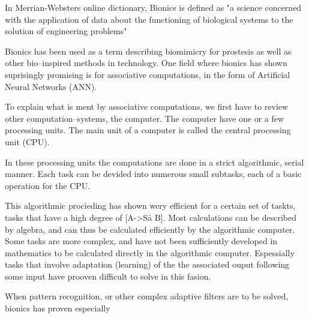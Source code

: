 
In Merrian-Websters online dictionary, Bionics is defined as 
"a science concerned with the application of data about the functioning of biological systems to the solution of engineering problems"

Bionics has been used as a term describing biomimicry for prostesis as well as other bio--inspired methods in technology.
One field where bionics has shown suprisingly promising is for associative computations, in the form of Artificial Neural Networks (ANN).

To explain what is ment by associative computations, we first have to review other computation--systems, the computer.
The computer have one or a few processing units. The main unit of a computer is called the central processing unit (CPU).

In these processing units the computations are done in a strict algorithmic, serial manner.
Each task can be devided into numerous small subtasks, each of a basic operation for the CPU.

This algorithmic procieding has shown wery efficient for a certain set of taskts, tasks that have a high degree of [A->Så B]. 
Most calculations can be described by algebra, and can thus be calculated efficiently by the algorithmic computer.
Some tasks are more complex, and have not been sufficiently developed in mathematics to be calculated directly in the algorithmic computer.
Espessially tasks that involve adaptation (learning) of the the associated ouput following some input have prooven difficult to solve in this fasion.

When pattern recognition, or other complex adaptive filters are to be solved, bionics has proven especially 








